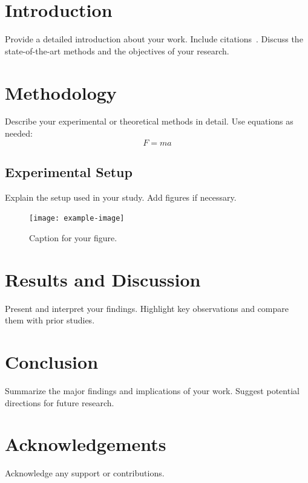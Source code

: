 \documentclass[11pt]{article}
\begin{document}
\begin{multicols}{2}
\section{Introduction}
Provide a detailed introduction about your work. Include citations~\cite{example}. Discuss the state-of-the-art methods and the objectives of your research.

\section{Methodology}
Describe your experimental or theoretical methods in detail. Use equations as needed:
\begin{equation}
F = ma
\end{equation}

\subsection{Experimental Setup}
Explain the setup used in your study. Add figures if necessary.

\begin{figure}[h!]
\centering
\texttt{[image: example-image]}
\caption{Caption for your figure.}
\label{fig:example}
\end{figure}

\section{Results and Discussion}
Present and interpret your findings. Highlight key observations and compare them with prior studies.

\section{Conclusion}
Summarize the major findings and implications of your work. Suggest potential directions for future research.

\section*{Acknowledgements}
Acknowledge any support or contributions.

\end{multicols}



\end{document}
